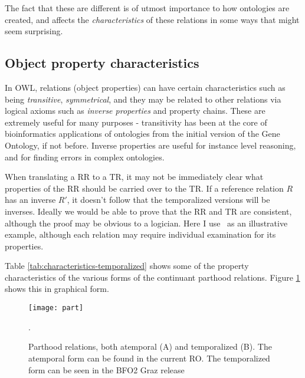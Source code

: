 \documentclass{bioinfo}
\def\partOf{\pr{part\_of}}
\begin{document}
The fact that these are different is of utmost importance to how
ontologies are created, and affects the \emph{characteristics} of
these relations in some ways that might seem surprising.

\subsection{Object property characteristics}

In OWL, relations (object properties) can have certain characteristics
such as being \emph{transitive}, \emph{symmetrical}, and they may be
related to other relations via logical axioms such as \emph{inverse
  properties} and property chains. These are extremely useful for many
purposes - transitivity has been at the core of bioinformatics
applications of ontologies from the initial version of the Gene
Ontology\cite{Ashburner2000}, if not before. Inverse properties are
useful for instance level reasoning, and for finding errors in complex
ontologies.

When translating a RR to a TR, it may not be immediately clear what
properties of the RR should be carried over to the TR. If a reference
relation $R$ has an inverse $R'$, it doesn't follow that the
temporalized versions will be inverses. Ideally we would be able to
prove that the RR and TR are consistent, although the proof may be
obvious to a logician. Here I use \partOf\ as an illustrative example,
although each relation may require individual examination for its
properties.

Table \ref{tab:characteristics-temporalized} shows some of the
property characteristics of the various forms of the continuant
parthood relations. Figure \ref{fig:part} shows this in graphical
form.

\begin{figure}
\center
\texttt{[image: part]}
\caption{Parthood relations, both atemporal (A) and temporalized
  (B). The atemporal form can be found in the current RO. The
  temporalized form can be seen in the BFO2 Graz release}.
\label{fig:part}
\end{figure}
\end{document}
